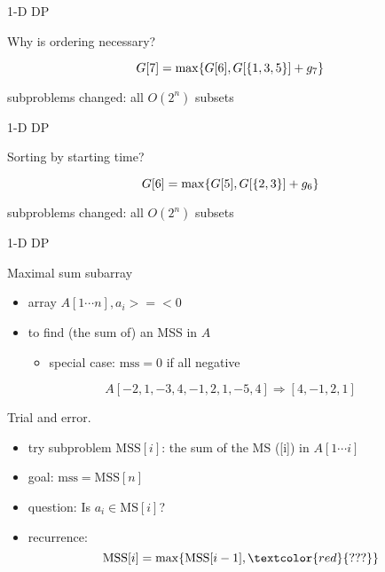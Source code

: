 \begin{frame}{1-D DP}
  \begin{alertblock}{Why is ordering necessary?}

    \[
      G[7] = \max \{G[6], G[\{1,3,5\}] + g_{7}\}
    \]

    \begin{center}
      subproblems changed: all $O(2^{n})$ subsets
    \end{center}
  \end{alertblock}
\end{frame}
\begin{frame}{1-D DP}
  \begin{alertblock}{Sorting by starting time?}

    \[
      G[6] = \max \{G[5], G[\{2,3\}] + g_{6}\}
    \]

    \begin{center}
      subproblems changed: all $O(2^{n})$ subsets
    \end{center}
  \end{alertblock}
\end{frame}
\begin{frame}{1-D DP}
  \begin{exampleblock}{Maximal sum subarray }
    \begin{itemize}
      \item array $A[1 \cdots n], a_{i} >=< 0$
      \item to find (the sum of) an MSS in $A$
	\begin{itemize}
	  \item special case: $\text{mss} = 0$ if all negative
	\end{itemize}
    \end{itemize}
	
    \[
      A[-2,1 ,-3,4,-1,2,1,-5,4] \Rightarrow [4,-1,2,1]
    \]
  \end{exampleblock}

  \pause
  \begin{alertblock}{Trial and error.}
    \begin{itemize}
      \item try subproblem $\text{MSS}[i]$: the sum of the MS ([i]) in $A[1 \cdots i]$
      \item goal: $\text{mss} = \text{MSS}[n]$
      \item question: Is $a_{i} \in \text{MS}[i]$?
      \item recurrence: 
	\[ 
	  \text{MSS}[i] = \max \set{\text{MSS}[i-1], \textcolor{red}{???}}
	\]
    \end{itemize}
  \end{alertblock}
\end{frame}
